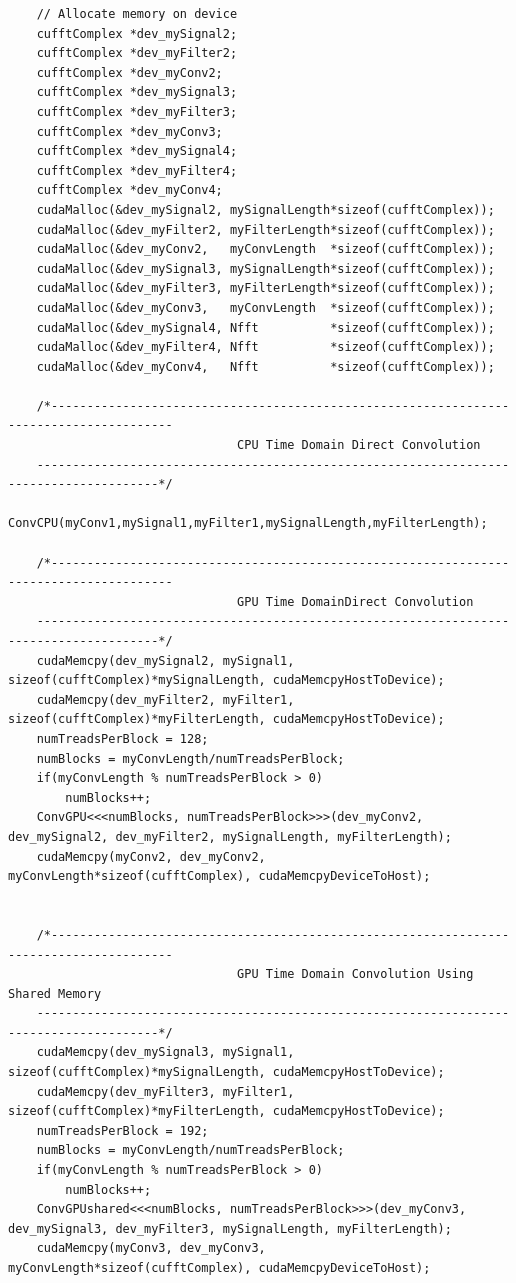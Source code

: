 \begin{lstlisting}
	// Allocate memory on device
	cufftComplex *dev_mySignal2;
	cufftComplex *dev_myFilter2;
	cufftComplex *dev_myConv2;
	cufftComplex *dev_mySignal3;
	cufftComplex *dev_myFilter3;
	cufftComplex *dev_myConv3;
	cufftComplex *dev_mySignal4;
	cufftComplex *dev_myFilter4;
	cufftComplex *dev_myConv4;
	cudaMalloc(&dev_mySignal2, mySignalLength*sizeof(cufftComplex));
	cudaMalloc(&dev_myFilter2, myFilterLength*sizeof(cufftComplex));
	cudaMalloc(&dev_myConv2,   myConvLength  *sizeof(cufftComplex));
	cudaMalloc(&dev_mySignal3, mySignalLength*sizeof(cufftComplex));
	cudaMalloc(&dev_myFilter3, myFilterLength*sizeof(cufftComplex));
	cudaMalloc(&dev_myConv3,   myConvLength  *sizeof(cufftComplex));
	cudaMalloc(&dev_mySignal4, Nfft          *sizeof(cufftComplex));
	cudaMalloc(&dev_myFilter4, Nfft          *sizeof(cufftComplex));
	cudaMalloc(&dev_myConv4,   Nfft          *sizeof(cufftComplex));

	/*---------------------------------------------------------------------------------------
                                CPU Time Domain Direct Convolution
	---------------------------------------------------------------------------------------*/
	ConvCPU(myConv1,mySignal1,myFilter1,mySignalLength,myFilterLength);

	/*---------------------------------------------------------------------------------------
                                GPU Time DomainDirect Convolution
	---------------------------------------------------------------------------------------*/
	cudaMemcpy(dev_mySignal2, mySignal1, sizeof(cufftComplex)*mySignalLength, cudaMemcpyHostToDevice);
	cudaMemcpy(dev_myFilter2, myFilter1, sizeof(cufftComplex)*myFilterLength, cudaMemcpyHostToDevice);
	numTreadsPerBlock = 128;
	numBlocks = myConvLength/numTreadsPerBlock;
	if(myConvLength % numTreadsPerBlock > 0)
		numBlocks++;
	ConvGPU<<<numBlocks, numTreadsPerBlock>>>(dev_myConv2, dev_mySignal2, dev_myFilter2, mySignalLength, myFilterLength);
	cudaMemcpy(myConv2, dev_myConv2, myConvLength*sizeof(cufftComplex), cudaMemcpyDeviceToHost);


	/*---------------------------------------------------------------------------------------
                                GPU Time Domain Convolution Using Shared Memory
	---------------------------------------------------------------------------------------*/
	cudaMemcpy(dev_mySignal3, mySignal1, sizeof(cufftComplex)*mySignalLength, cudaMemcpyHostToDevice);
	cudaMemcpy(dev_myFilter3, myFilter1, sizeof(cufftComplex)*myFilterLength, cudaMemcpyHostToDevice);
	numTreadsPerBlock = 192;
	numBlocks = myConvLength/numTreadsPerBlock;
	if(myConvLength % numTreadsPerBlock > 0)
		numBlocks++;
	ConvGPUshared<<<numBlocks, numTreadsPerBlock>>>(dev_myConv3, dev_mySignal3, dev_myFilter3, mySignalLength, myFilterLength);
	cudaMemcpy(myConv3, dev_myConv3, myConvLength*sizeof(cufftComplex), cudaMemcpyDeviceToHost);


\end{lstlisting}

